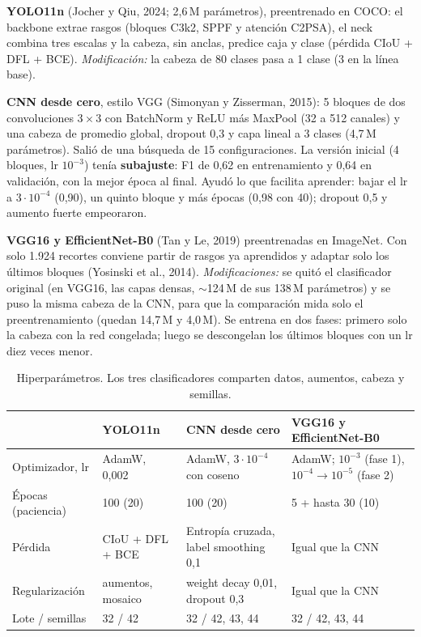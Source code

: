 \documentclass[10pt,letterpaper]{article}
\begin{document}
\textbf{YOLO11n} (Jocher y Qiu, 2024; 2,6\,M parámetros), preentrenado en COCO: el backbone extrae rasgos (bloques C3k2, SPPF y atención C2PSA), el neck combina tres escalas y la cabeza, sin anclas, predice caja y clase (pérdida CIoU + DFL + BCE). \textit{Modificación:} la cabeza de 80 clases pasa a 1 clase (3 en la línea base).

\textbf{CNN desde cero}, estilo VGG (Simonyan y Zisserman, 2015): 5 bloques de dos convoluciones 3\,$\times$\,3 con BatchNorm y ReLU más MaxPool (32 a 512 canales) y una cabeza de promedio global, dropout 0,3 y capa lineal a 3 clases (4,7\,M parámetros). Salió de una búsqueda de 15 configuraciones. La versión inicial (4 bloques, lr $10^{-3}$) tenía \textbf{subajuste}: F1 de 0,62 en entrenamiento y 0,64 en validación, con la mejor época al final. Ayudó lo que facilita aprender: bajar el lr a $3\cdot10^{-4}$ (0,90), un quinto bloque y más épocas (0,98 con 40); dropout 0,5 y aumento fuerte empeoraron.

\textbf{VGG16 y EfficientNet-B0} (Tan y Le, 2019) preentrenadas en ImageNet. Con solo 1.924 recortes conviene partir de rasgos ya aprendidos y adaptar solo los últimos bloques (Yosinski et al., 2014). \textit{Modificaciones:} se quitó el clasificador original (en VGG16, las capas densas, $\sim$124\,M de sus 138\,M parámetros) y se puso la misma cabeza de la CNN, para que la comparación mida solo el preentrenamiento (quedan 14,7\,M y 4,0\,M). Se entrena en dos fases: primero solo la cabeza con la red congelada; luego se descongelan los últimos bloques con un lr diez veces menor.

\begin{table}[h]
\centering\small
\caption{Hiperparámetros. Los tres clasificadores comparten datos, aumentos, cabeza y semillas.}
\label{tab:hiper}
\begin{tabular}{llll}
\toprule
 & YOLO11n & CNN desde cero & VGG16 y EfficientNet-B0 \\
\midrule
Optimizador, lr & AdamW, 0,002 & AdamW, $3\cdot10^{-4}$ con coseno & AdamW; $10^{-3}$ (fase 1), $10^{-4}\!\to\!10^{-5}$ (fase 2) \\
Épocas (paciencia) & 100 (20) & 100 (20) & 5 + hasta 30 (10) \\
Pérdida & CIoU + DFL + BCE & Entropía cruzada, label smoothing 0,1 & Igual que la CNN \\
Regularización & aumentos, mosaico & weight decay 0,01, dropout 0,3 & Igual que la CNN \\
Lote / semillas & 32 / 42 & 32 / 42, 43, 44 & 32 / 42, 43, 44 \\
\bottomrule
\end{tabular}
\end{table}
\end{document}
